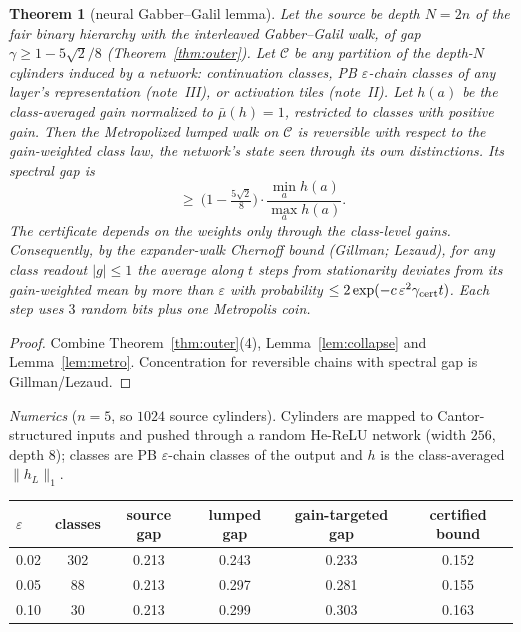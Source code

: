 \documentclass[11pt]{article}
\newtheorem{theorem}{Theorem}[section]
\theoremstyle{definition}
\theoremstyle{remark}
\begin{document}
\begin{theorem}[neural Gabber--Galil lemma]\label{thm:ngg}
Let the source be depth $N=2n$ of the fair binary hierarchy with the interleaved Gabber--Galil walk, of gap $\gamma\ge1-5\sqrt2/8$ (Theorem~\ref{thm:outer}). Let $\mathcal C$ be \emph{any} partition of the depth-$N$ cylinders induced by a network: continuation classes, PB $\varepsilon$-chain classes of any layer's representation (note~III), or activation tiles (note~II). Let $h(a)$ be the class-averaged gain normalized to $\bar\mu(h)=1$, restricted to classes with positive gain. Then the Metropolized lumped walk on $\mathcal C$ is reversible with respect to the gain-weighted class law, the network's state seen through its own distinctions. Its spectral gap is
\[\ \ge\ \Big(1-\tfrac{5\sqrt2}{8}\Big)\cdot\frac{\min_ah(a)}{\max_ah(a)}.\]
The certificate depends on the weights only through the class-level gains. Consequently, by the expander-walk Chernoff bound (Gillman; Lezaud), for any class readout $|g|\le1$ the average along $t$ steps from stationarity deviates from its gain-weighted mean by more than $\varepsilon$ with probability $\le2\exp(-c\,\varepsilon^2\gamma_{\rm cert}t)$. Each step uses $3$ random bits plus one Metropolis coin.
\end{theorem}

\begin{proof}
Combine Theorem~\ref{thm:outer}(4), Lemma~\ref{lem:collapse} and Lemma~\ref{lem:metro}. Concentration for reversible chains with spectral gap is Gillman/Lezaud.
\end{proof}

\noindent\emph{Numerics} ($n=5$, so $1024$ source cylinders). Cylinders are mapped to Cantor-structured inputs and pushed through a random He-ReLU network (width $256$, depth $8$); classes are PB $\varepsilon$-chain classes of the output and $h$ is the class-averaged $\|h_L\|_1$.
\begin{center}\small
\begin{tabular}{lccccc}
\toprule
$\varepsilon$ & classes & source gap & lumped gap & gain-targeted gap & certified bound\\
\midrule
0.02 & 302 & 0.213 & 0.243 & 0.233 & 0.152\\
0.05 & 88 & 0.213 & 0.297 & 0.281 & 0.155\\
0.10 & 30 & 0.213 & 0.299 & 0.303 & 0.163\\
\bottomrule
\end{tabular}
\end{center}
\end{document}
